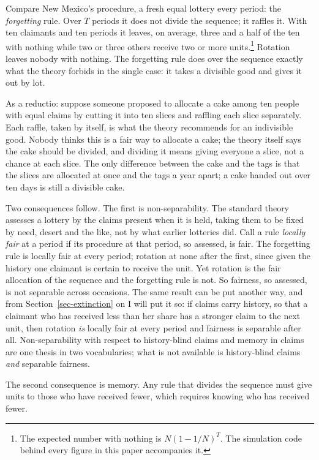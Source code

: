\documentclass[
  11pt,
  letterpaper,
  DIV=11,
  numbers=noendperiod,
  twoside]{scrartcl}
\newcounter{none} %
\begin{document}
Compare New Mexico's procedure, a fresh equal lottery every period: the
\emph{forgetting} rule. Over \(T\) periods it does not divide the
sequence; it raffles it. With ten claimants and ten periods it leaves,
on average, three and a half of the ten with nothing while two or three
others receive two or more units.\footnote{The expected number with
  nothing is \(N(1-1/N)^T\). The simulation code behind every figure in
  this paper accompanies it.} Rotation leaves nobody with nothing. The
forgetting rule does over the sequence exactly what the theory forbids
in the single case: it takes a divisible good and gives it out by lot.

As a reductio: suppose someone proposed to allocate a cake among ten
people with equal claims by cutting it into ten slices and raffling each
slice separately. Each raffle, taken by itself, is what the theory
recommends for an indivisible good. Nobody thinks this is a fair way to
allocate a cake; the theory itself says the cake should be divided, and
dividing it means giving everyone a slice, not a chance at each slice.
The only difference between the cake and the tags is that the slices are
allocated at once and the tags a year apart; a cake handed out over ten
days is still a divisible cake.

Two consequences follow. The first is non-separability. The standard
theory assesses a lottery by the claims present when it is held, taking
them to be fixed by need, desert and the like, not by what earlier
lotteries did. Call a rule \emph{locally fair} at a period if its
procedure at that period, so assessed, is fair. The forgetting rule is
locally fair at every period; rotation at none after the first, since
given the history one claimant is certain to receive the unit. Yet
rotation is the fair allocation of the sequence and the forgetting rule
is not. So fairness, so assessed, is not separable across occasions. The
same result can be put another way, and from
Section~\ref{sec-extinction} on I will put it so: if claims carry
history, so that a claimant who has received less than her share has a
stronger claim to the next unit, then rotation \emph{is} locally fair at
every period and fairness is separable after all. Non-separability with
respect to history-blind claims and memory in claims are one thesis in
two vocabularies; what is not available is history-blind claims
\emph{and} separable fairness.

The second consequence is memory. Any rule that divides the sequence
must give units to those who have received fewer, which requires knowing
who has received fewer.
\end{document}
